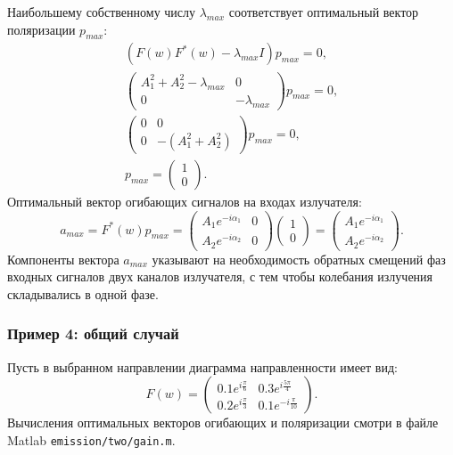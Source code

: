Наибольшему собственному числу $\lambda_{max}$ соответствует оптимальный вектор поляризации $p_{max}$:
\begin{gather*}
    (F(w)F^*(w) - \lambda_{max} I) p_{max} = 0 , \\
%
    \begin{pmatrix}
        A_1^2 + A_2^2 - \lambda_{max} & 0               \\
        0                             & - \lambda_{max}
    \end{pmatrix}
    p_{max} = 0 , \\
%
    \begin{pmatrix}
        0 & 0                 \\
        0 & - (A_1^2 + A_2^2)
    \end{pmatrix}
    p_{max} = 0 , \\
%
    p_{max} = \begin{pmatrix}
                  1 \\
                  0
    \end{pmatrix} .
\end{gather*}
Оптимальный вектор огибающих сигналов на входах излучателя:
\[
    a_{max}
    = F^*(w) p_{max}
    = \begin{pmatrix}
          A_1 e^{- i \alpha_1} & 0 \\
          A_2 e^{- i \alpha_2} & 0
    \end{pmatrix}
    \begin{pmatrix}
        1 \\
        0
    \end{pmatrix}
    = \begin{pmatrix}
          A_1 e^{- i \alpha_1} \\
          A_2 e^{- i \alpha_2}
    \end{pmatrix} .
\]
Компоненты вектора $a_{max}$ указывают на необходимость обратных смещений фаз входных сигналов двух каналов излучателя, с тем чтобы колебания излучения складывались в одной фазе.

\subsubsection{Пример 4: общий случай}

Пусть в выбранном направлении диаграмма направленности имеет вид:
\[
    F(w)
    =
    \begin{pmatrix}
        0.1 e^{i \frac{\pi}{6}} & 0.3 e^{i \frac{5 \pi}{4}}  \\
        0.2 e^{i \frac{\pi}{3}} & 0.1 e^{- i \frac{\pi}{10}}
    \end{pmatrix} .
\]
Вычисления оптимальных векторов огибающих и поляризации смотри в файле Matlab \texttt{emission/two/gain.m}.

